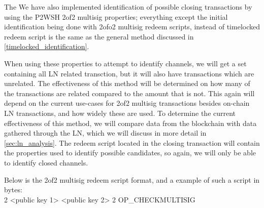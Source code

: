 The 
We have also implemented identification of possible closing transactions by using the P2WSH 2of2 multisig properties; everything except the initial identification being done with 2ofo2 multisig redeem scripts, instead of timelocked redeem script is the same as the general method discussed in \cref{timelocked_identification}.



 When using these properties to attempt to identify channels, we will get a set containing all LN related transction, but it will also have transactions which are unrelated. The effectiveness of this method will be determined on how many of the transactions are related compared to the amount that is not. This again will depend on the current use-cases for 2of2 multisig transactions besides on-chain LN transactions, and how widely these are used. To determine the current effectiveness of this method, we will compare data from the blockchain with data gathered through the LN, which we will discuss in more detail in \cref{sec:ln_analysis}. 
 The redeem script located in the closing transaction will contain the properties used to identify possible candidates, so again, we will only be able to identify closed channels.
 
 
 
 
Below is the 2of2 multisig redeem script format, and a example of such a script in bytes:
\\

2 <public key 1> <public key 2> 2 OP\_CHECKMULTISIG
\\

\noindent [82 33 2 211 153 245 240 225 125 95 140 116 20 99 81 38 139 135 136 59 14 125 34 181 148 47 67 16 42 24 147 28 144 61 33 33 2 215 1 70 141 233 112 91 253 252 202 27 73 158 254 234 159 125 98 30 78 159 235 6 46 167 103 105 239 180 125 168 66 82 174]
\\

